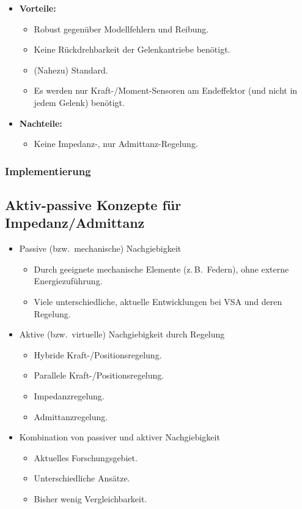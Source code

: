 \documentclass[a4paper, 11pt, accentcolor = tud3b]{tudreport}
\newcommand{\bzw}{bzw.~}
\newcommand{\zB}{z.\,B.~}
\begin{document}
				\begin{itemize}
					\item \textbf{Vorteile:}
						\begin{itemize}
							\item Robust gegenüber Modellfehlern und Reibung.
							\item Keine Rückdrehbarkeit der Gelenkantriebe benötigt.
							\item (Nahezu) Standard.
							\item Es werden nur Kraft-/Moment-Sensoren am Endeffektor (und nicht in jedem Gelenk) benötigt.
						\end{itemize}
					\item \textbf{Nachteile:}
						\begin{itemize}
							\item Keine Impedanz-, nur Admittanz-Regelung.
						\end{itemize}
				\end{itemize}

				\subsubsection{Implementierung} %

			\subsection{Aktiv-passive Konzepte für Impedanz/Admittanz}
				\begin{itemize}
					\item Passive (\bzw mechanische) Nachgiebigkeit
						\begin{itemize}
							\item Durch geeignete mechanische Elemente (\zB Federn), ohne externe Energiezuführung.
							\item Viele unterschiedliche, aktuelle Entwicklungen bei VSA und deren Regelung.
						\end{itemize}
					\item Aktive (\bzw virtuelle) Nachgiebigkeit durch Regelung
						\begin{itemize}
							\item Hybride Kraft-/Positionsregelung.
							\item Parallele Kraft-/Positionsregelung.
							\item Impedanzregelung.
							\item Admittanzregelung.
						\end{itemize}
					\item Kombination von passiver und aktiver Nachgiebigkeit
						\begin{itemize}
							\item Aktuelles Forschungsgebiet.
							\item Unterschiedliche Ansätze.
							\item Bisher wenig Vergleichbarkeit.
						\end{itemize}
				\end{itemize}
\end{document}
